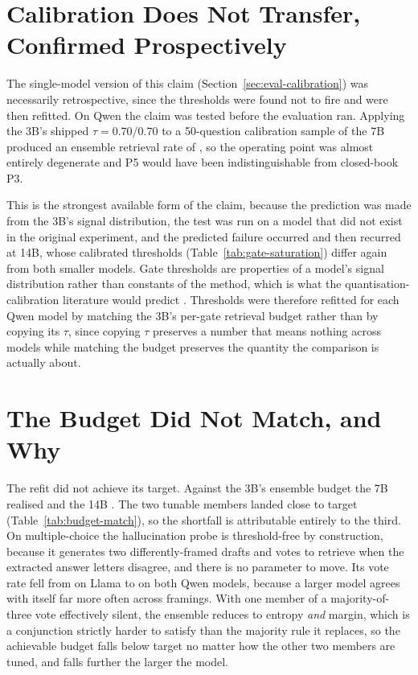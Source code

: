 \section{Calibration Does Not Transfer, Confirmed Prospectively}
\label{sec:scaling-nontransfer}

The single-model version of this claim (Section~\ref{sec:eval-calibration})
was necessarily retrospective, since the thresholds were found not to fire and
were then refitted. On Qwen the claim was tested before the evaluation ran.
Applying the 3B's shipped $\tau = 0.70/0.70$ to a 50-question calibration
sample of the 7B produced an ensemble retrieval rate of
\retQwenCalibAtLlamaTau{}, so the operating point was almost entirely
degenerate and P5 would have been indistinguishable from closed-book P3.

This is the strongest available form of the claim, because the prediction was
made from the 3B's signal distribution, the test was run on a model that did
not exist in the original experiment, and the predicted failure occurred and
then recurred at 14B, whose calibrated thresholds
(Table~\ref{tab:gate-saturation}) differ again from both smaller models. Gate
thresholds are properties of a model's signal distribution rather than
constants of the method, which is what the quantisation-calibration literature
would predict \citep{proskurina2024quantization}. Thresholds were therefore
refitted for each Qwen model by matching the 3B's per-gate retrieval budget
rather than by copying its $\tau$, since copying $\tau$ preserves a number
that means nothing across models while matching the budget preserves the
quantity the comparison is actually about.

\section{The Budget Did Not Match, and Why}
\label{sec:scaling-budget}



The refit did not achieve its target. Against the 3B's \retPfiveMcq{}
ensemble budget the 7B realised \retQwenPfiveMcq{} and the 14B
\retQwenFourteenPfiveMcq{}. The two tunable members landed close to target
(Table~\ref{tab:budget-match}), so the shortfall is attributable entirely to
the third. On multiple-choice the hallucination probe is threshold-free by
construction, because it generates two differently-framed drafts and votes to
retrieve when the extracted answer letters disagree, and there is no parameter
to move. Its vote rate fell from \probeFireLlamaMcq{} on Llama to
\probeFireQwenMcq{} on both Qwen models, because a larger model agrees with
itself far more often across framings. With one member of a majority-of-three
vote effectively silent, the ensemble reduces to entropy \emph{and} margin,
which is a conjunction strictly harder to satisfy than the majority rule it
replaces, so the achievable budget falls below target no matter how the other
two members are tuned, and falls further the larger the model.

